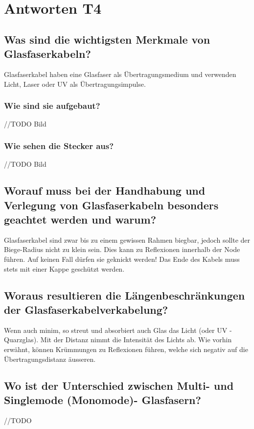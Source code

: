 \section{Antworten T4}
\subsection*{Was sind die wichtigsten Merkmale von Glasfaserkabeln?}
Glasfaserkabel haben eine Glasfaser als Übertragungsmedium und verwenden Licht, Laser oder UV als Übertragungsimpulse.

\subsubsection*{Wie sind sie aufgebaut?}
//TODO Bild

\subsubsection*{Wie sehen die Stecker aus?}
//TODO Bild

\subsection*{Worauf muss bei der Handhabung und Verlegung von Glasfaserkabeln besonders geachtet werden und warum?}
Glasfaserkabel sind zwar bis zu einem gewissen Rahmen biegbar, jedoch sollte der Biege-Radius nicht zu klein sein. Dies kann zu Reflexionen innerhalb der Node führen. Auf keinen Fall dürfen sie geknickt werden! Das Ende des Kabels muss stets mit einer Kappe geschützt werden.

\subsection*{Woraus resultieren die Längenbeschränkungen der Glasfaserkabelverkabelung?}
Wenn auch minim, so streut und absorbiert auch Glas das Licht (oder UV - Quarzglas). Mit der Distanz nimmt die Intensität des Lichts ab. Wie vorhin erwähnt, können Krümmungen zu Reflexionen führen, welche sich negativ auf die Übertragungsdistanz äusseren.

\subsection*{Wo ist der Unterschied zwischen Multi- und Singlemode (Monomode)- Glasfasern?}
//TODO


